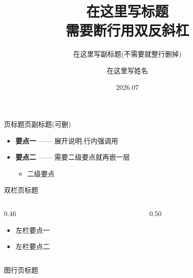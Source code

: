 \documentclass[aspectratio=169,11pt,t]{beamer}
\title{在这里写标题\\需要断行用双反斜杠}
\subtitle{在这里写副标题(不需要就整行删掉)}
\author{在这里写姓名}
\institute{单位(不需要就整行删掉)}
\date{2026.07}
\begin{document}
\DAcover     %
\DAtoc       %


\begin{frame}{页标题}{页副标题(可删)}
  \begin{itemize}
    \item \textbf{要点一} —— 展开说明,行内强调用 
    \item \textbf{要点二} —— 需要二级要点就再嵌一层
    \begin{itemize}
      \item 二级要点
    \end{itemize}
  \end{itemize}
\end{frame}

\begin{frame}{双栏页标题}
  \begin{columns}[T]
    \begin{column}{0.46\textwidth}
      \begin{itemize}
        \item 左栏要点一
        \item 左栏要点二
      \end{itemize}
      \medskip
    \end{column}
    \begin{column}{0.50\textwidth}
    \end{column}
  \end{columns}
\end{frame}

\begin{frame}{图行页标题}
  \begin{DAfigrow}
    \hfill
  \end{DAfigrow}
\end{frame}
\end{document}
